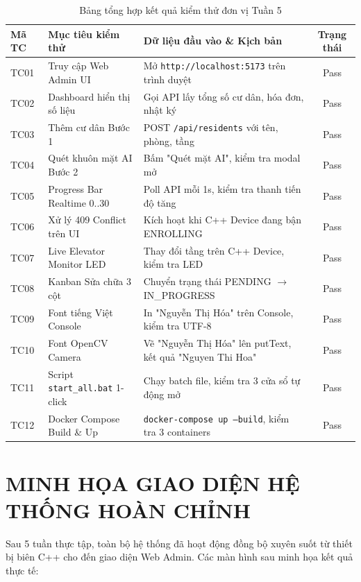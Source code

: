 \documentclass[12pt,a4paper]{article}
\begin{document}
\begin{table}[H]
\centering
\small
\begin{tabularx}{\textwidth}{|l|X|X|c|}
\hline
\textbf{Mã TC} & \textbf{Mục tiêu kiểm thử} & \textbf{Dữ liệu đầu vào \& Kịch bản} & \textbf{Trạng thái} \\ \hline
TC01 & Truy cập Web Admin UI & Mở \texttt{http://localhost:5173} trên trình duyệt & Pass \\ \hline
TC02 & Dashboard hiển thị số liệu & Gọi API lấy tổng số cư dân, hóa đơn, nhật ký & Pass \\ \hline
TC03 & Thêm cư dân Bước 1 & POST \texttt{/api/residents} với tên, phòng, tầng & Pass \\ \hline
TC04 & Quét khuôn mặt AI Bước 2 & Bấm "Quét mặt AI", kiểm tra modal mở & Pass \\ \hline
TC05 & Progress Bar Realtime 0..30 & Poll API mỗi 1s, kiểm tra thanh tiến độ tăng & Pass \\ \hline
TC06 & Xử lý 409 Conflict trên UI & Kích hoạt khi C++ Device đang bận ENROLLING & Pass \\ \hline
TC07 & Live Elevator Monitor LED & Thay đổi tầng trên C++ Device, kiểm tra LED & Pass \\ \hline
TC08 & Kanban Sửa chữa 3 cột & Chuyển trạng thái PENDING $\rightarrow$ IN\_PROGRESS & Pass \\ \hline
TC09 & Font tiếng Việt Console & In "Nguyễn Thị Hóa" trên Console, kiểm tra UTF-8 & Pass \\ \hline
TC10 & Font OpenCV Camera & Vẽ "Nguyễn Thị Hóa" lên putText, kết quả "Nguyen Thi Hoa" & Pass \\ \hline
TC11 & Script \texttt{start\_all.bat} 1-click & Chạy batch file, kiểm tra 3 cửa sổ tự động mở & Pass \\ \hline
TC12 & Docker Compose Build \& Up & \texttt{docker-compose up --build}, kiểm tra 3 containers & Pass \\ \hline
\end{tabularx}
\caption{Bảng tổng hợp kết quả kiểm thử đơn vị Tuần 5}
\end{table}

\section{MINH HỌA GIAO DIỆN HỆ THỐNG HOÀN CHỈNH}

Sau 5 tuần thực tập, toàn bộ hệ thống đã hoạt động đồng bộ xuyên suốt từ thiết bị biên C++ cho đến giao diện Web Admin. Các màn hình sau minh họa kết quả thực tế:
\end{document}
